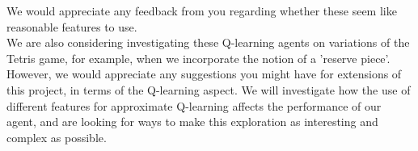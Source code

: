 \documentclass{article}
\begin{document}
We would appreciate any feedback from you regarding whether these seem like reasonable features to use. \\

We are also considering investigating these Q-learning agents on variations of the Tetris game, for example, when we incorporate the notion of a 'reserve piece'. However, we would appreciate any suggestions you might have for extensions of this project, in terms of the Q-learning aspect. We will investigate how the use of different features for approximate Q-learning affects the performance of our agent, and are looking for ways to make this exploration as interesting and complex as possible.
\end{document}
